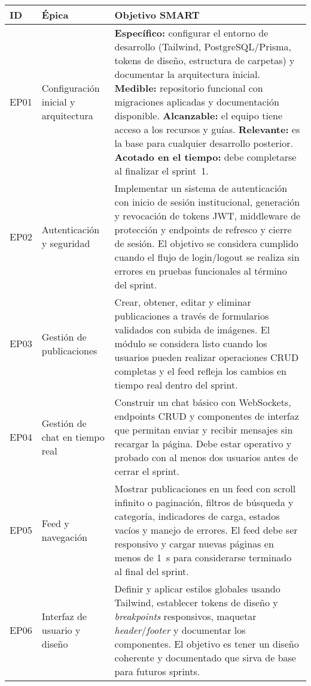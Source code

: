 \documentclass{article}
\begin{document}
\begin{longtable}{|p{}|p{}|p{}|}
\hline
\textbf{ID} & \textbf{\'{E}pica} & \textbf{Objetivo SMART} \\
\hline
EP01 & Configuraci\'on inicial y arquitectura & \textbf{Espec\'ifico:} configurar el entorno de desarrollo (Tailwind, PostgreSQL/Prisma, tokens de dise\~no, estructura de carpetas) y documentar la arquitectura inicial. \textbf{Medible:} repositorio funcional con migraciones aplicadas y documentaci\'on disponible. \textbf{Alcanzable:} el equipo tiene acceso a los recursos y gu\'ias. \textbf{Relevante:} es la base para cualquier desarrollo posterior. \textbf{Acotado en el tiempo:} debe completarse al finalizar el sprint~1. \\
\hline
EP02 & Autenticaci\'on y seguridad & Implementar un sistema de autenticaci\'on con inicio de sesi\'on institucional, generaci\'on y revocaci\'on de tokens JWT, middleware de protecci\'on y endpoints de refresco y cierre de sesi\'on. El objetivo se considera cumplido cuando el flujo de login/logout se realiza sin errores en pruebas funcionales al t\'ermino del sprint. \\
\hline
EP03 & Gesti\'on de publicaciones & Crear, obtener, editar y eliminar publicaciones a trav\'es de formularios validados con subida de im\'agenes. El m\'odulo se considera listo cuando los usuarios pueden realizar operaciones CRUD completas y el feed refleja los cambios en tiempo real dentro del sprint. \\
\hline
EP04 & Gesti\'on de chat en tiempo real & Construir un chat b\'asico con WebSockets, endpoints CRUD y componentes de interfaz que permitan enviar y recibir mensajes sin recargar la p\'agina. Debe estar operativo y probado con al menos dos usuarios antes de cerrar el sprint. \\
\hline
EP05 & Feed y navegaci\'on & Mostrar publicaciones en un feed con scroll infinito o paginaci\'on, filtros de b\'usqueda y categor\'ia, indicadores de carga, estados vac\'ios y manejo de errores. El feed debe ser responsivo y cargar nuevas p\'aginas en menos de 1~s para considerarse terminado al final del sprint. \\
\hline
EP06 & Interfaz de usuario y dise\~no & Definir y aplicar estilos globales usando Tailwind, establecer tokens de dise\~no y \emph{breakpoints} responsivos, maquetar \emph{header}/\emph{footer} y documentar los componentes. El objetivo es tener un dise\~no coherente y documentado que sirva de base para futuros sprints. \\

\end{longtable}
\end{document}
